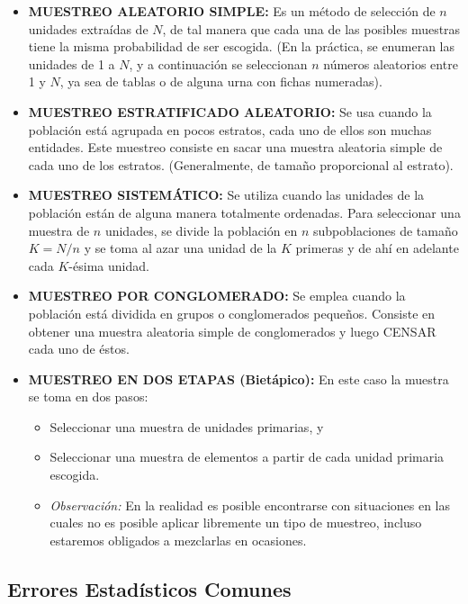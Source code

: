 \documentclass[a4paper]{report} %
\begin{document}
\begin{itemize}
    \item \textbf{MUESTREO ALEATORIO SIMPLE:} Es un m\'etodo de selecci\'on de $n$ unidades extra\'idas de $N$, de tal manera que cada una de las posibles muestras tiene la misma probabilidad de ser escogida. (En la pr\'actica, se enumeran las unidades de 1 a $N$, y a continuaci\'on se seleccionan $n$ n\'umeros aleatorios entre 1 y $N$, ya sea de tablas o de alguna urna con fichas numeradas).
    \item \textbf{MUESTREO ESTRATIFICADO ALEATORIO:} Se usa cuando la poblaci\'on est\'a agrupada en pocos estratos, cada uno de ellos son muchas entidades. Este muestreo consiste en sacar una muestra aleatoria simple de cada uno de los estratos. (Generalmente, de tama\~no proporcional al estrato).
    \item \textbf{MUESTREO SISTEM\'ATICO:} Se utiliza cuando las unidades de la poblaci\'on est\'an de alguna manera totalmente ordenadas. Para seleccionar una muestra de $n$ unidades, se divide la poblaci\'on en $n$ subpoblaciones de tama\~no $K = N/n$ y se toma al azar una unidad de la $K$ primeras y de ah\'i en adelante cada $K$-\'esima unidad.
    \item \textbf{MUESTREO POR CONGLOMERADO:} Se emplea cuando la poblaci\'on est\'a dividida en grupos o conglomerados peque\~nos. Consiste en obtener una muestra aleatoria simple de conglomerados y luego CENSAR cada uno de \'estos.
    \item \textbf{MUESTREO EN DOS ETAPAS (Biet\'apico):} En este caso la muestra se toma en dos pasos:
    \begin{itemize}
        \item Seleccionar una muestra de unidades primarias, y 
        \item Seleccionar una muestra de elementos a partir de cada unidad primaria escogida.
        \item \textit{Observaci\'on:} En la realidad es posible encontrarse con situaciones en las cuales no es posible aplicar libremente un tipo de muestreo, incluso estaremos obligados a mezclarlas en ocasiones.
    \end{itemize}
\end{itemize}

\subsection{Errores Estad\'isticos Comunes}
\end{document}
